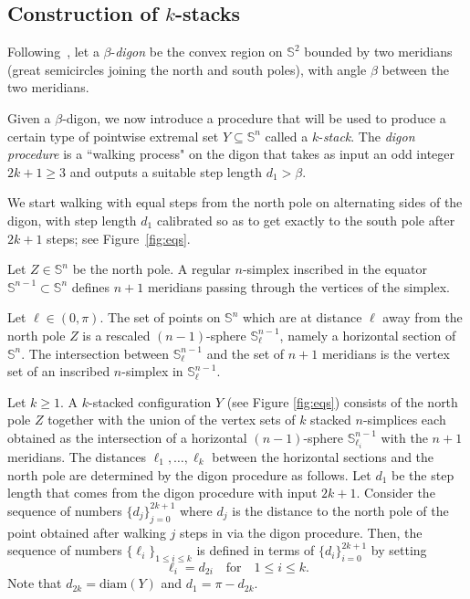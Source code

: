 \documentclass[12pt]{amsart}
\theoremstyle{plain}
\newcommand{\Sp}{\mathbb{S}}
\newcommand{\diam}{\mathrm{diam}}
\newcommand{\np}{Z}
\numberwithin{equation}{section}
\begin{document}
\subsection{Construction of $k$-stacks}\label{subsec:stack_config}

Following~\cite{katz1989diameter}, let a $\beta$-\emph{digon} be the
convex region on $\Sp^2$ bounded by two meridians (great semicircles
joining the north and south poles), with angle $\beta$ between the two
meridians.

Given a $\beta$-digon, we now introduce a procedure that will be used
to produce a certain type of pointwise extremal set $Y\subseteq \Sp^n$
called a $k$-\emph{stack}. The \emph{digon procedure} is a ``walking
process" on the digon that takes as input an odd integer $2k + 1
\geq3$ and outputs a suitable step length $d_1 > \beta$.

We start walking with equal steps from the north pole on alternating sides of the digon, with step length $d_1$ calibrated so as to get exactly to the south pole after $2k+1$ steps; see Figure~\ref{fig:eqs}.

Let $\np\in\Sp^n$ be the north pole.  A regular $n$-simplex inscribed
in the equator $\Sp^{n-1}\subset\Sp^{n}$ defines $n+1$ meridians
passing through the vertices of the simplex.

Let $\ell \in (0, \pi)$.  The set of points on $\Sp^n$ which are at
distance $\ell$ away from the north pole $\np$ is a rescaled
$(n-1)$-sphere $\Sp_\ell^{n-1}$, namely a horizontal section of
$\Sp^n$.  The intersection between $\Sp_\ell^{n-1}$ and the set of
$n+1$ meridians is the vertex set of an inscribed $n$-simplex in
$\Sp_\ell^{n-1}$.


Let $k\geq1$.  A $k$-stacked configuration $Y$ (see Figure
\ref{fig:eqs}) consists of the north pole $\np$ together with the
union of the vertex sets of $k$ stacked $n$-simplices each obtained as
the intersection of a horizontal $(n-1)$-sphere $\Sp^{n-1}_{\ell_i}$
with the $n+1$ meridians. The distances $\ell_1,\ldots,\ell_k$ between
the horizontal sections and the north pole are determined by the digon
procedure as follows.  Let $d_1$ be the step length that comes from
the digon procedure with input $2k+1$.  Consider the sequence of
numbers $\{d_j\}_{j=0}^{2k+1}$ where $d_j$ is the distance to the
north pole of the point obtained after walking $j$ steps in via the
digon procedure.  Then, the sequence of numbers $\{\ell_{i}\}_{1\leq i
  \leq k}$ is defined in terms of $\{d_i\}_{i=0}^{2k+1}$
by setting
\[
\ell_i=d_{2i} \quad \text{for} \quad 1\leq i\leq k.
\]
Note that $d_{2k}=\diam(Y)$ and $d_{1} = \pi - d_{2k}$.
\end{document}
